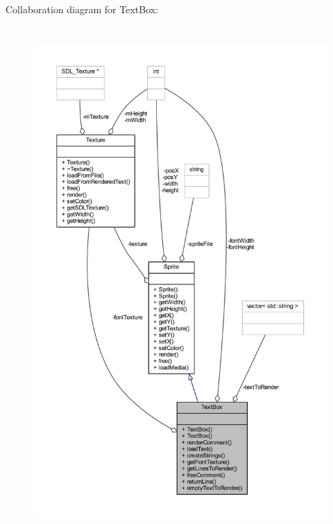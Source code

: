 Collaboration diagram for Text\+Box\+:\nopagebreak
\begin{figure}[H]
\begin{center}
\leavevmode
\includegraphics[height=550pt]{class_text_box__coll__graph}
\end{center}
\end{figure}
